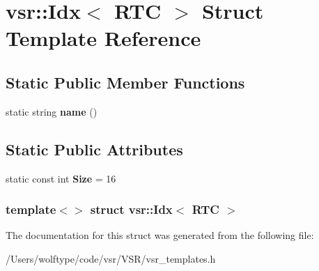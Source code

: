 \hypertarget{structvsr_1_1_idx_3_01_r_t_c_01_4}{\section{vsr\-:\-:Idx$<$ R\-T\-C $>$ Struct Template Reference}
\label{structvsr_1_1_idx_3_01_r_t_c_01_4}
}
\subsection*{Static Public Member Functions}
\begin{DoxyCompactItemize}
\item 
\hypertarget{structvsr_1_1_idx_3_01_r_t_c_01_4_a286d6072a4b1075190b0e58209e50753}{static string {\bfseries name} ()}\label{structvsr_1_1_idx_3_01_r_t_c_01_4_a286d6072a4b1075190b0e58209e50753}

\end{DoxyCompactItemize}
\subsection*{Static Public Attributes}
\begin{DoxyCompactItemize}
\item 
\hypertarget{structvsr_1_1_idx_3_01_r_t_c_01_4_aaa2fac532645f412edf8f80f4373f153}{static const int {\bfseries Size} = 16}\label{structvsr_1_1_idx_3_01_r_t_c_01_4_aaa2fac532645f412edf8f80f4373f153}

\end{DoxyCompactItemize}
\subsubsection*{template$<$$>$ struct vsr\-::\-Idx$<$ R\-T\-C $>$}



The documentation for this struct was generated from the following file\-:\begin{DoxyCompactItemize}
\item 
/\-Users/wolftype/code/vsr/\-V\-S\-R/vsr\-\_\-templates.\-h\end{DoxyCompactItemize}
